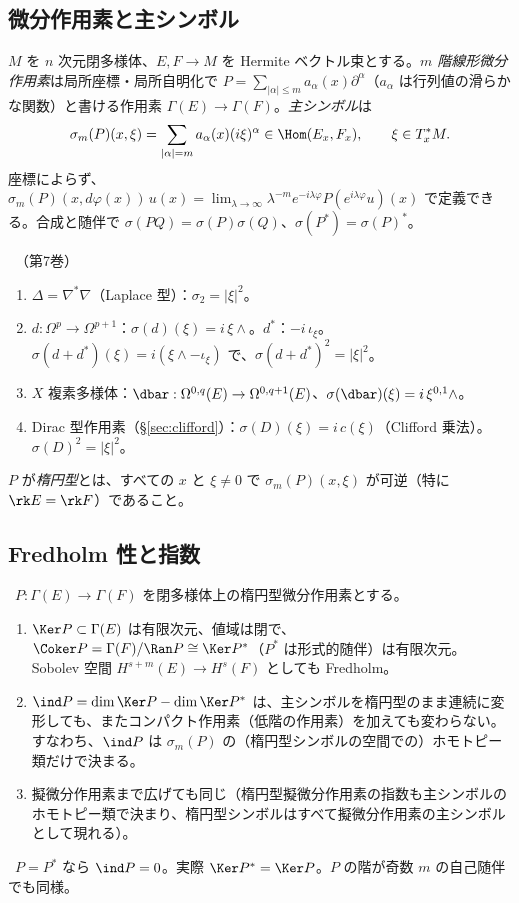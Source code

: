 \subsection{微分作用素と主シンボル}
$M$ を $n$ 次元閉多様体、$E,F\to M$ を Hermite ベクトル束とする。\emph{$m$ 階線形微分作用素}は局所座標・局所自明化で $P=\sum_{|\alpha|\le m}a_\alpha(x)\partial^\alpha$（$a_\alpha$ は行列値の滑らかな関数）と書ける作用素 $\Gamma(E)\to\Gamma(F)$。\emph{主シンボル}は
\[
\sigma_m(P)(x,\xi)=\sum_{|\alpha|=m}a_\alpha(x)(i\xi)^\alpha\in\Hom(E_x,F_x),\qquad\xi\in T_x^*M.
\]
座標によらず、$\sigma_m(P)(x,d\varphi(x))\,u(x)=\lim_{\lambda\to\infty}\lambda^{-m}e^{-i\lambda\varphi}P(e^{i\lambda\varphi}u)(x)$ で定義できる。合成と随伴で $\sigma(PQ)=\sigma(P)\sigma(Q)$、$\sigma(P^*)=\sigma(P)^*$。
\begin{ex}[基本的な作用素のシンボル]\label{ex:symbols}\tC\ （第7巻）
\begin{enumerate}
\item $\Delta=\nabla^*\nabla$（Laplace 型）：$\sigma_2=|\xi|^2$。
\item $d:\Omega^p\to\Omega^{p+1}$：$\sigma(d)(\xi)=i\,\xi\wedge$。$d^*$：$-i\,\iota_\xi$。$\sigma(d+d^*)(\xi)=i(\xi\wedge-\iota_\xi)$ で、$\sigma(d+d^*)^2=|\xi|^2$。
\item $X$ 複素多様体：$\dbar:\Omega^{0,q}(E)\to\Omega^{0,q+1}(E)$、$\sigma(\dbar)(\xi)=i\,\xi^{0,1}\wedge$。
\item Dirac 型作用素（\S\ref{sec:clifford}）：$\sigma(D)(\xi)=i\,c(\xi)$（Clifford 乗法）。$\sigma(D)^2=|\xi|^2$。
\end{enumerate}
\end{ex}
$P$ が\emph{楕円型}とは、すべての $x$ と $\xi\ne0$ で $\sigma_m(P)(x,\xi)$ が可逆（特に $\rk E=\rk F$）であること。
\subsection{Fredholm 性と指数}
\begin{thm}[第7巻]\label{thm:fredholm}\tC\
$P:\Gamma(E)\to\Gamma(F)$ を閉多様体上の楕円型微分作用素とする。
\begin{enumerate}
\item $\Ker P\subset\Gamma(E)$ は有限次元、値域は閉で、$\Coker P=\Gamma(F)/\Ran P\cong\Ker P^*$（$P^*$ は形式的随伴）は有限次元。Sobolev 空間 $H^{s+m}(E)\to H^s(F)$ としても Fredholm。
\item $\ind P=\dim\Ker P-\dim\Ker P^*$ は、主シンボルを楕円型のまま連続に変形しても、またコンパクト作用素（低階の作用素）を加えても変わらない。すなわち、$\ind P$ は $\sigma_m(P)$ の（楕円型シンボルの空間での）ホモトピー類だけで決まる。
\item 擬微分作用素まで広げても同じ（楕円型擬微分作用素の指数も主シンボルのホモトピー類で決まり、楕円型シンボルはすべて擬微分作用素の主シンボルとして現れる）。
\end{enumerate}
\end{thm}
\begin{ex}\label{ex:selfadj}\tP\
$P=P^*$ なら $\ind P=0$。実際 $\Ker P^*=\Ker P$。$P$ の階が奇数 $m$ の自己随伴でも同様。
\end{ex}
